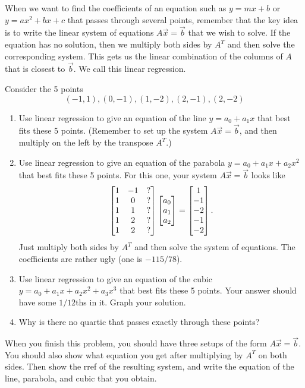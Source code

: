 \mysubsection{\ideapro}
When we want to find the coefficients of an equation such as $y=mx+b$ or $y=ax^2+bx+c$ that passes through several points, remember that the key idea is to write the linear system of equations $A\vec x=\vec b$ that we wish to solve.  If the equation has no solution, then we multiply both sides by $A^T$ and then solve the corresponding system.  This gets us the linear combination of the columns of $A$ that is closest to $\vec b$. We call this linear regression. 
\begin{problem}
 Consider the 5 points 
$$ 
(-1,  1),
( 0, -1),
( 1, -2),
( 2, -1),
( 2, -2)
$$
\begin{enumerate}
 \item Use linear regression to give an equation of the line $y=a_0+a_1x$ that best fits these 5 points. (Remember to set up the system $A\vec x = \vec b$, and then multiply on the left by the transpose $A^T$.) 
 \item Use linear regression to give an equation of the parabola $y=a_0+a_1x+a_2x^2$ that best fits these 5 points. 
 For this one, your system $A\vec x=\vec b$ looks like 
 $$\begin{bmatrix} \begin{matrix} 1\\1\\1\\1\\1 \end{matrix}&\begin{matrix} -1\\0\\1\\2\\2 \end{matrix}&\begin{matrix} ?\\?\\?\\?\\? \end{matrix} \end{bmatrix}\begin{bmatrix} a_0\\a_1\\a_2 \end{bmatrix}=\begin{bmatrix} 1\\-1\\-2\\-1\\-2 \end{bmatrix}.$$ Just multiply both sides by $A^T$ and then solve the system of equations. The coefficients are rather ugly (one is $-115/78$).
 \item Use linear regression to give an equation of the cubic $y=a_0+a_1x+a_2x^2+a_3x^3$ that best fits these 5 points. Your answer should have some $1/12$ths in it. Graph your solution. 
 \item Why is there no quartic that passes exactly through these points?
\end{enumerate}
When you finish this problem, you should have three setups of the form $A\vec x=\vec b$. You should also show what equation you get after multiplying by $A^T$ on both sides.  Then show the rref of the resulting system, and write the equation of the line, parabola, and cubic that you obtain. 
\end{problem}









